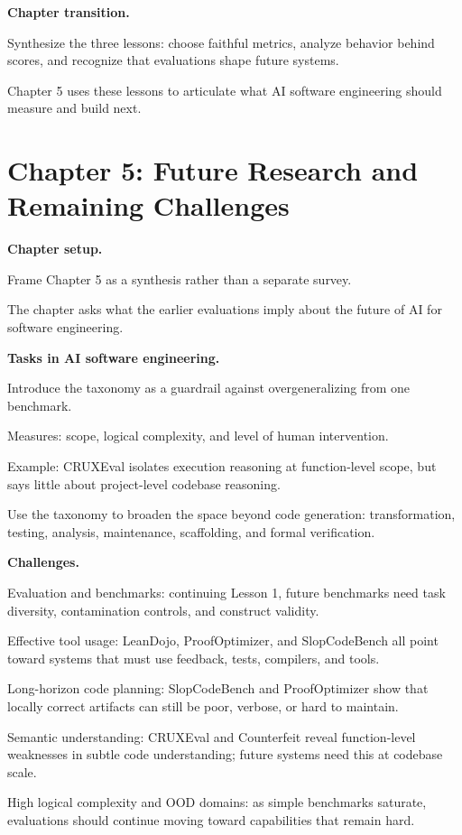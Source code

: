 \documentclass[10pt,twocolumn]{article}
\let\olditemize\itemize
\let\oldenditemize\enditemize
\renewenvironment{itemize}{\olditemize
  \setlength{\itemsep}{1pt}
  \setlength{\parskip}{0pt}
  \setlength{\parsep}{0pt}
  \setlength{\topsep}{2pt}
}{\oldenditemize}
\begin{document}
\textbf{Chapter transition.}
\begin{itemize}
  \item Synthesize the three lessons: choose faithful metrics, analyze behavior behind scores, and recognize that evaluations shape future systems.
  \item Chapter 5 uses these lessons to articulate what AI software engineering should measure and build next.
\end{itemize}

\section*{Chapter 5: Future Research and Remaining Challenges}

\textbf{Chapter setup.}
\begin{itemize}
  \item Frame Chapter 5 as a synthesis rather than a separate survey.
  \item The chapter asks what the earlier evaluations imply about the future of AI for software engineering.
\end{itemize}

\textbf{Tasks in AI software engineering.}
\begin{itemize}
  \item Introduce the taxonomy as a guardrail against overgeneralizing from one benchmark.
  \item Measures: scope, logical complexity, and level of human intervention.
  \item Example: CRUXEval isolates execution reasoning at function-level scope, but says little about project-level codebase reasoning.
  \item Use the taxonomy to broaden the space beyond code generation: transformation, testing, analysis, maintenance, scaffolding, and formal verification.
\end{itemize}

\textbf{Challenges.}
\begin{itemize}
  \item Evaluation and benchmarks: continuing Lesson 1, future benchmarks need task diversity, contamination controls, and construct validity.
  \item Effective tool usage: LeanDojo, ProofOptimizer, and SlopCodeBench all point toward systems that must use feedback, tests, compilers, and tools.
  \item Long-horizon code planning: SlopCodeBench and ProofOptimizer show that locally correct artifacts can still be poor, verbose, or hard to maintain.
  \item Semantic understanding: CRUXEval and Counterfeit reveal function-level weaknesses in subtle code understanding; future systems need this at codebase scale.
  \item High logical complexity and OOD domains: as simple benchmarks saturate, evaluations should continue moving toward capabilities that remain hard.
\end{itemize}
\end{document}
